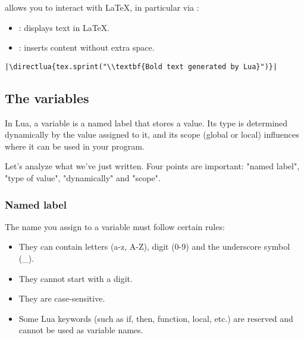 \tkzEngine{\LUALATEX} allows you to interact with LaTeX, in particular via :

\begin{itemize}
\item {}: displays text in LaTeX.
\item {}: inserts content without extra space.\\
\end{itemize}

\begin{mybox}
\begin{verbatim}
|\directlua{tex.sprint("\\textbf{Bold text generated by Lua}")}|
\end{verbatim}
\end{mybox}


\subsection{The variables}

\begin{mybox}
  In Lua, a variable is a named label that stores a value. Its type is determined dynamically by the value assigned to it, and its scope (global or local) influences where it can be used in your program.
\end{mybox}

Let's analyze what we've just written. Four points are important: "named label", "type of value", "dynamically" and "scope".


\subsubsection{Named label}

The name you assign to a variable must follow certain rules:

\begin{itemize}
  \item They can contain letters (a-z, A-Z), digit (0-9) and the underscore symbol (\_).
  \item They cannot start with a digit.
  \item They are case-sensitive.
  \item Some Lua keywords (such as if, then, function, local, etc.) are reserved and cannot be used as variable names.
\end{itemize}

